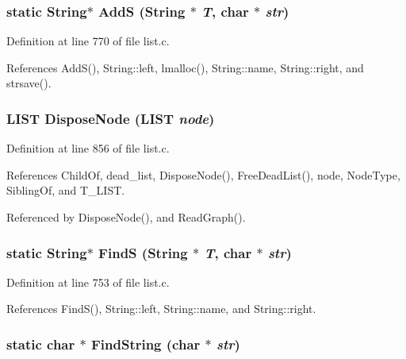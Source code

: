 \subsubsection{\setlength{\rightskip}{0pt plus 5cm}static \bf{String}$\ast$ Add\-S (\bf{String} $\ast$ {\em T}, char $\ast$ {\em str})\hspace{0.3cm}{\tt  [static]}}\label{list_8c_86072d6f98027c19c8489b4f82ae91fc}




Definition at line 770 of file list.c.

References Add\-S(), String::left, lmalloc(), String::name, String::right, and strsave().
\subsubsection{\setlength{\rightskip}{0pt plus 5cm}\bf{LIST} Dispose\-Node (\bf{LIST} {\em node})}\label{list_8c_b1cb91e33a6f7af3a3cd4d93beb46128}




Definition at line 856 of file list.c.

References Child\-Of, dead\_\-list, Dispose\-Node(), Free\-Dead\-List(), node, Node\-Type, Sibling\-Of, and T\_\-LIST.

Referenced by Dispose\-Node(), and Read\-Graph().
\subsubsection{\setlength{\rightskip}{0pt plus 5cm}static \bf{String}$\ast$ Find\-S (\bf{String} $\ast$ {\em T}, char $\ast$ {\em str})\hspace{0.3cm}{\tt  [static]}}\label{list_8c_b081a5f42c774c6a9fbdeff7f7d5d6f9}




Definition at line 753 of file list.c.

References Find\-S(), String::left, String::name, and String::right.
\subsubsection{\setlength{\rightskip}{0pt plus 5cm}static char $\ast$ Find\-String (char $\ast$ {\em str})\hspace{0.3cm}{\tt  [static]}}\label{list_8c_2439ea9453fafeb47922b2ceb85f1115}




